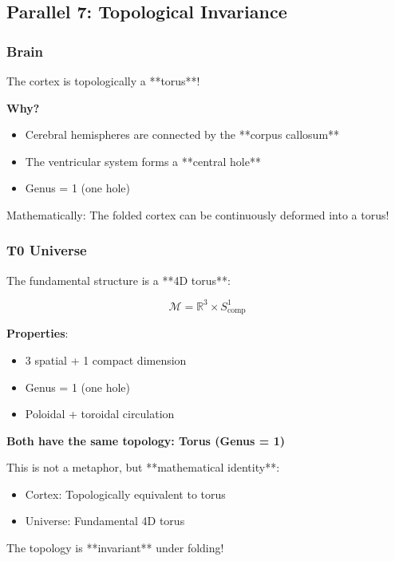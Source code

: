 	\subsection{Parallel 7: Topological Invariance}
	
	\subsubsection{Brain}
	
	The cortex is topologically a **torus**!
	
	\textbf{Why?}
	\begin{itemize}
		\item Cerebral hemispheres are connected by the **corpus callosum**
		\item The ventricular system forms a **central hole**
		\item Genus = 1 (one hole)
	\end{itemize}
	
	Mathematically: The folded cortex can be continuously deformed into a torus!
	
	\subsubsection{T0 Universe}
	
	The fundamental structure is a **4D torus**:
	
	\begin{equation}
		\mathcal{M} = \mathbb{R}^3 \times S^1_{\text{comp}}
	\end{equation}
	
	\textbf{Properties}:
	\begin{itemize}
		\item 3 spatial + 1 compact dimension
		\item Genus = 1 (one hole)
		\item Poloidal + toroidal circulation
	\end{itemize}
	
	\begin{keyresult}
		\textbf{Both have the same topology: Torus (Genus = 1)}
		
		This is not a metaphor, but **mathematical identity**:
		
		\begin{itemize}
			\item Cortex: Topologically equivalent to torus
			\item Universe: Fundamental 4D torus
		\end{itemize}
		
		The topology is **invariant** under folding!
	\end{keyresult}
	
